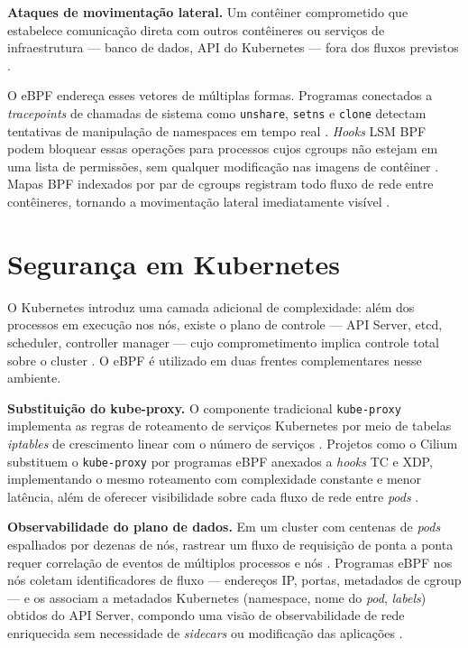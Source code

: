 \textbf{Ataques de movimentação lateral.}
Um contêiner comprometido que estabelece comunicação direta com outros contêineres
ou serviços de infraestrutura — banco de dados, API do Kubernetes — fora dos
fluxos previstos \cite{cassagnes2020}.

O eBPF endereça esses vetores de múltiplas formas.
Programas conectados a \textit{tracepoints} de chamadas de sistema como
\texttt{unshare}, \texttt{setns} e \texttt{clone} detectam tentativas de
manipulação de namespaces em tempo real \cite{linuxkernel2024}.
\textit{Hooks} LSM BPF podem bloquear essas operações para processos cujos cgroups
não estejam em uma lista de permissões, sem qualquer modificação nas imagens de
contêiner \cite{gregg2019}.
Mapas BPF indexados por par de cgroups registram todo fluxo de rede entre
contêineres, tornando a movimentação lateral imediatamente visível \cite{majors2022}.

\section{Segurança em Kubernetes}

O Kubernetes introduz uma camada adicional de complexidade: além dos processos
em execução nos nós, existe o plano de controle — API Server, etcd, scheduler,
controller manager — cujo comprometimento implica controle total sobre o cluster
\cite{beyer2016}.
O eBPF é utilizado em duas frentes complementares nesse ambiente.

\textbf{Substituição do kube-proxy.}
O componente tradicional \texttt{kube-proxy} implementa as regras de roteamento
de serviços Kubernetes por meio de tabelas \textit{iptables} de crescimento
linear com o número de serviços \cite{linuxkernel2024}.
Projetos como o Cilium substituem o \texttt{kube-proxy} por programas eBPF anexados
a \textit{hooks} TC e XDP, implementando o mesmo roteamento com complexidade
constante e menor latência, além de oferecer visibilidade sobre cada fluxo de
rede entre \textit{pods} \cite{cassagnes2020}.

\textbf{Observabilidade do plano de dados.}
Em um cluster com centenas de \textit{pods} espalhados por dezenas de nós, rastrear
um fluxo de requisição de ponta a ponta requer correlação de eventos de múltiplos
processos e nós \cite{majors2022}.
Programas eBPF nos nós coletam identificadores de fluxo — endereços IP, portas,
metadados de cgroup — e os associam a metadados Kubernetes (namespace, nome do
\textit{pod}, \textit{labels}) obtidos do API Server, compondo uma visão de
observabilidade de rede enriquecida sem necessidade de \textit{sidecars} ou
modificação das aplicações \cite{linuxkernel2024}.

